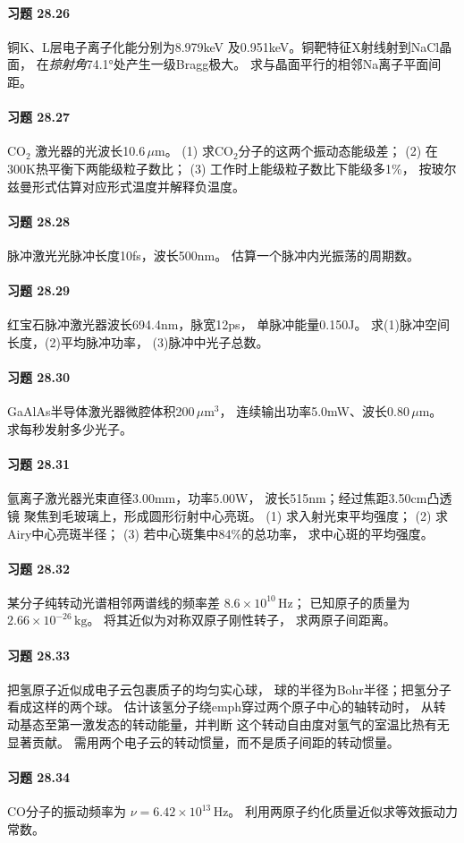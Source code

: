 \paragraph{习题 28.26}
铜K、L层电子离子化能分别为8.979keV
及0.951keV。铜靶特征X射线射到NaCl晶面，
在\emph{掠射角}74.1°处产生一级Bragg极大。
求与晶面平行的相邻Na离子平面间距。
\paragraph{习题 28.27}
CO$_2$ 激光器的光波长10.6\,$\mu$m。
(1) 求CO$_2$分子的这两个振动态能级差；
(2) 在300K热平衡下两能级粒子数比；
(3) 工作时上能级粒子数比下能级多1\%，
按玻尔兹曼形式估算对应形式温度并解释负温度。
\paragraph{习题 28.28}
脉冲激光光脉冲长度10fs，波长500nm。
估算一个脉冲内光振荡的周期数。
\paragraph{习题 28.29}
红宝石脉冲激光器波长694.4nm，脉宽12ps，
单脉冲能量0.150J。
求(1)脉冲空间长度，(2)平均脉冲功率，
(3)脉冲中光子总数。
\paragraph{习题 28.30}
GaAlAs半导体激光器微腔体积200\,$\mu$m$^3$，
连续输出功率5.0mW、波长0.80\,$\mu$m。
求每秒发射多少光子。
\paragraph{习题 28.31}
氩离子激光器光束直径3.00mm，功率5.00W，
波长515nm；经过焦距3.50cm凸透镜
聚焦到毛玻璃上，形成圆形衍射中心亮斑。
(1) 求入射光束平均强度；
(2) 求Airy中心亮斑半径；
(3) 若中心斑集中84\%的总功率，
求中心斑的平均强度。
\paragraph{习题 28.32}
某分子纯转动光谱相邻两谱线的频率差
\(8.6\times10^{10}\,\mathrm{Hz}\)；
已知原子的质量为
\(2.66\times10^{-26}\,\mathrm{kg}\)。
将其近似为对称双原子刚性转子，
求两原子间距离。
\paragraph{习题 28.33}
把氢原子近似成电子云包裹质子的均匀实心球，
球的半径为Bohr半径；把氢分子看成这样的两个球。
估计该氢分子绕emph{穿过两个原子中心的轴}转动时，
从转动基态至第一激发态的转动能量，并判断
这个转动自由度对氢气的室温比热有无显著贡献。
需用两个电子云的转动惯量，而不是质子间距的转动惯量。
\paragraph{习题 28.34}
CO分子的振动频率为
\(\nu=6.42\times10^{13}\,\mathrm{Hz}\)。
利用两原子约化质量近似求等效振动力常数。
